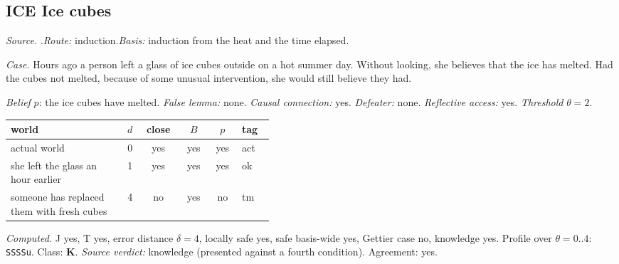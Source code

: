 \subsection*{ICE \enspace Ice cubes}
\noindent\textit{Source.} \citet{Vogel1987}.\quad \textit{Route:} induction.\quad \textit{Basis:} induction from the heat and the time elapsed.\par
\noindent\textit{Case.} Hours ago a person left a glass of ice cubes outside on a hot summer day. Without looking, she believes that the ice has melted. Had the cubes not melted, because of some unusual intervention, she would still believe they had.\par
\noindent\textit{Belief} $p$: the ice cubes have melted.
 \textit{False lemma:} none. \textit{Causal connection:} yes. \textit{Defeater:} none. \textit{Reflective access:} yes. \textit{Threshold} $\theta = 2$.\par
\begin{center}\begin{tabular}{@{}p{0.43\linewidth}rcccl@{}}
world & $d$ & close & $B$ & $p$ & tag \\ \midrule
actual world & 0 & yes & yes & yes & act \\
she left the glass an hour earlier & 1 & yes & yes & yes & ok \\
someone has replaced them with fresh cubes & 4 & no & yes & no & tm \\
\end{tabular}\end{center}
\noindent\textit{Computed.} J yes, T yes, error distance $\delta = 4$, locally safe yes, safe basis-wide yes, Gettier case no, knowledge yes. Profile over $\theta = 0..4$: \texttt{SSSSu}. Class: \textbf{K}.
 \textit{Source verdict:} knowledge (presented against a fourth condition). Agreement: yes.
\par\medskip
{}
